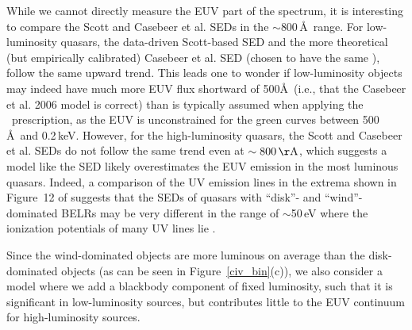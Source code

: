 While we cannot directly measure the EUV part of the spectrum, it is interesting to compare the Scott and Casebeer et al. SEDs in the $\sim$800\,\AA\ range.  
For low-luminosity quasars, the data-driven Scott-based SED and the more theoretical (but empirically calibrated) Casebeer et al. SED (chosen to have the same \aox), follow the same upward trend.  This leads one to wonder if low-luminosity objects may indeed have much more EUV flux shortward of 500\AA\ (i.e., that the Casebeer et al. 2006 model is correct)
 than is typically assumed when applying the \luvaox\ prescription, as the EUV is unconstrained for the green curves between 500\,\AA\ and 0.2\,keV.  However, for the high-luminosity quasars, the Scott and Casebeer et al. SEDs do not follow the same trend even at $\sim800\,{\rm \AA}$, which suggests a model like the \citet{Casebeer:2006} SED likely overestimates the EUV emission in the most luminous quasars.
Indeed, a comparison of the UV emission lines in the extrema shown in Figure~12 of \citet{Richards:2011} suggests that the SEDs of quasars with ``disk''- and ``wind''-dominated BELRs may be very different in the range of $\sim$50\,eV where the ionization potentials of many UV lines lie \citep[e.g.,][Figure 13]{Richards:2011}.  

Since the wind-dominated objects are more luminous on average than the disk-dominated objects (as can be seen in Figure~\ref{civ_bin}(c)), we also consider a model where we add a blackbody component of fixed luminosity, such that it is significant in low-luminosity sources, but contributes little to the EUV continuum for high-luminosity sources.

